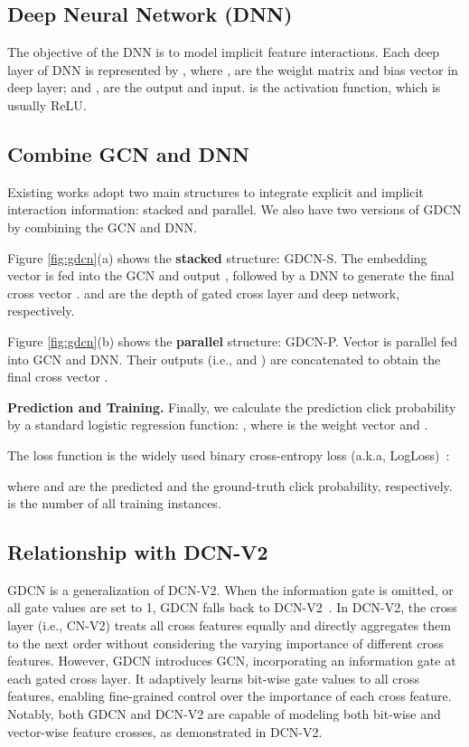 \documentclass[sigconf]{acmart}
\begin{document}
\subsection{Deep Neural Network (DNN)}
The objective of the DNN is to model implicit feature interactions. Each deep layer of DNN is represented by , where ,  are the weight matrix and bias vector in  deep layer; and ,  are the output and input.  is the activation function, which is usually ReLU. 



\subsection{Combine GCN and DNN}
Existing works adopt two main structures to integrate explicit and implicit interaction information: stacked and parallel. We also have two versions of GDCN by combining the GCN and DNN. 

Figure  \ref{fig:gdcn}(a) shows the \textbf{stacked} structure: GDCN-S.
The embedding vector  is fed into the GCN and output , followed by a DNN to generate the final cross vector .  and  are the depth of gated cross layer and deep network, respectively. 

Figure \ref{fig:gdcn}(b) shows the \textbf{parallel} structure: GDCN-P. Vector  is parallel fed into GCN and DNN. Their outputs (i.e.,  and ) are concatenated to obtain the final cross vector .


\textbf{Prediction and Training.} Finally, we calculate the prediction click probability  by a standard logistic regression function: , where  is the weight vector and . 

The loss function is the widely used binary cross-entropy loss (a.k.a, LogLoss)~\cite{wang2021dcnm, liu2019fgcnn, zhu2022bars}: 

where  and  are the predicted and the ground-truth click probability, respectively.  is the number of all training instances.

\subsection{Relationship with DCN-V2} 

GDCN is a generalization of DCN-V2. When the information gate is omitted, or all gate values are set to 1, GDCN falls back to DCN-V2~\cite{wang2021dcnm}. In DCN-V2, the cross layer (i.e., CN-V2) treats all cross features equally and directly aggregates them to the next order without considering the varying importance of different cross features. However, GDCN introduces GCN, incorporating an information gate at each gated cross layer. It adaptively learns bit-wise gate values to all cross features, enabling fine-grained control over the importance of each cross feature. Notably, both GDCN and DCN-V2 are capable of modeling both bit-wise and vector-wise feature crosses, as demonstrated in DCN-V2.
\end{document}
